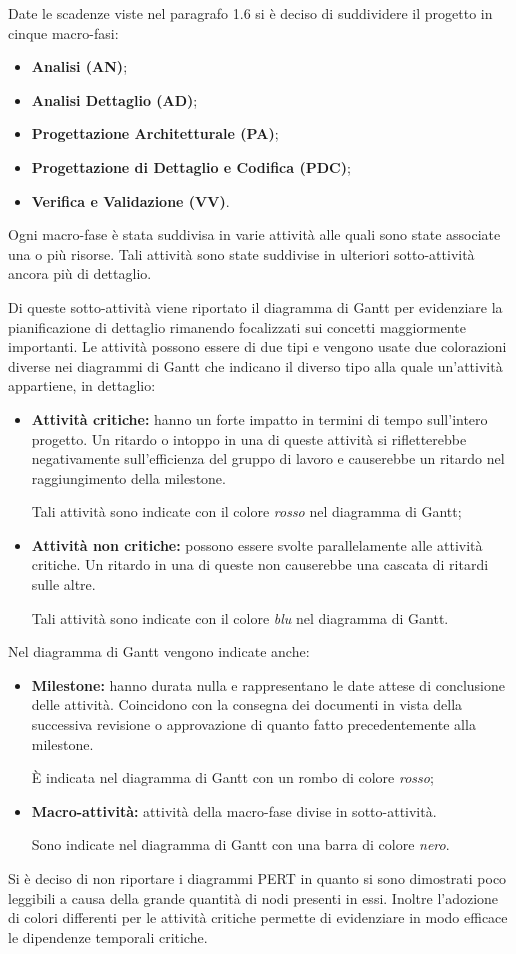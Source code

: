 Date le scadenze viste nel paragrafo 1.6 si è deciso di suddividere il progetto \PROGETTO{} in cinque macro-fasi:
\begin{itemize}
	\item \textbf{Analisi (AN)};
	\item \textbf{Analisi Dettaglio (AD)};
	\item \textbf{Progettazione Architetturale (PA)};
	\item \textbf{Progettazione di Dettaglio e Codifica (PDC)};
	\item \textbf{Verifica e Validazione (VV)}.
\end{itemize}
Ogni macro-fase è stata suddivisa in varie attività alle quali sono state associate una o più risorse. Tali attività sono state suddivise in ulteriori sotto-attività ancora più di dettaglio. 

\noindent Di queste sotto-attività viene riportato il diagramma di Gantt per evidenziare la pianificazione di dettaglio rimanendo focalizzati sui concetti maggiormente importanti. Le attività possono essere di due tipi e vengono usate due colorazioni diverse nei diagrammi di Gantt che indicano il diverso tipo alla quale un'attività appartiene, in dettaglio:
\begin{itemize}
	\item \textbf{Attività critiche:} hanno un forte impatto in termini di tempo sull'intero progetto. Un ritardo o intoppo in una di queste attività si rifletterebbe negativamente sull'efficienza del gruppo di lavoro e causerebbe un ritardo nel raggiungimento della milestone.
	
	\noindent Tali attività sono indicate con il colore \textit{rosso} nel diagramma di Gantt;
	\item \textbf{Attività non critiche:} possono essere svolte parallelamente alle attività critiche. Un ritardo in una di	queste non causerebbe una cascata di ritardi sulle altre.
	
	\noindent Tali attività sono indicate con il colore \textit{blu} nel diagramma di Gantt.
\end{itemize}
Nel diagramma di Gantt vengono indicate anche:
\begin{itemize}
	\item \textbf{Milestone:} hanno durata nulla e rappresentano le date attese di conclusione delle attività. Coincidono con la consegna dei documenti  in vista della successiva revisione o approvazione di quanto fatto precedentemente alla milestone. 
	
	\noindent È indicata nel diagramma di Gantt con un rombo di colore \textit{rosso};
	\item \textbf{Macro-attività:} attività della macro-fase divise in sotto-attività. 
	
	\noindent Sono indicate nel diagramma di Gantt con una barra di colore \textit{nero}.
\end{itemize}
Si è deciso di non riportare i diagrammi PERT in quanto si sono dimostrati poco leggibili a causa della grande quantità di nodi presenti in essi. Inoltre l'adozione di colori differenti per le attività critiche permette di evidenziare in modo efficace le dipendenze temporali critiche.

